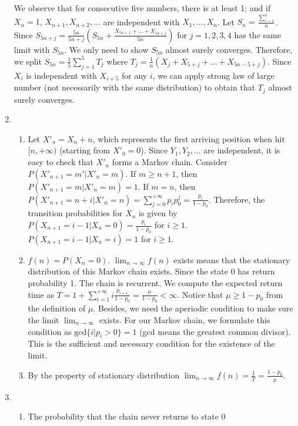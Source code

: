 \documentclass{article}
\begin{document}
\begin{enumerate}
We observe that for consecutive five numbers, there
is at least 1; and if $X_n=1$, $X_{n+1}, X_{n+2},
\dots$ are independent with $X_{1}, \dots, X_{n}$.
Let $S_n=\frac{\sum_{i=1}^n}{n}$.
Since $S_{5n+j} = \frac{5n}{5n+j}(S_{5n} + \frac{X_{5n+1}+\dots + X_{5n+j}}{5n})$ for $j=1,2,3,4$ has the same limit with $S_{5n}$.
We only need to show $S_{5n}$ almost surely converges.
Therefore, we split $S_{5n}=\frac{1}{5}\sum_{j=1}^5 T_j$
where $T_j
= \frac{1}{n}(X_j + X_{5+j} + \dots + X_{5n-5+j})$.
Since $X_i$ is independent with $X_{i+5}$
for any $i$, we can apply strong law of large number
(not necessarily with the same
distribution) to obtain that $T_j$ almost surely
converges.
\item 
\begin{enumerate}
    \item Let $X'_n = X_n + n$, which
    represents the first arriving position when hit $[n,+\infty)$ (starting
    from $X'_0=0$).
    Since $Y_1, Y_2, \dots $ are
    independent, it is easy to check that
    $X'_n$ forms a Markov chain.
    Consider $P(X'_{n+1}=m'| X'_n=m)$.
    If $m\geq n+1$, then $P(X'_{n+1}=m| X'_n=m)=1$.
    If $m=n$, then
    $P(X'_{n+1}=n+i|X'_n=n)=
    \sum_{j=0}^{+\infty} p_i p_0^j
    =\frac{p_i}{1-p_0}$.
    Therefore, the transition probabilities
    for $X_n$ is given by
    $P(X_{n+1}=i-1 | X_n=0) = \frac{p_i}{1-p_0}$
    for $i\geq 1$.
    $P(X_{n+1}=i-1|X_n=i)=1$
    for $i\geq 1$.
    \item $f(n)=P(X_n=0)$. $\lim_{n\to \infty} f(n)$
    exists means that
    the stationary distribution of this Markov chain exists. Since the state $0$ has return probability 1. The chain is recurrent.
    We compute the expected return time
    as $T=1+\sum_{i=1}^{+\infty} i\frac{p_{i+1}}{1-p_0} = \frac{\mu}{1-p_0} <\infty$. Notice that $\mu\geq 1-p_0$ from
    the definition of $\mu$. Besides, we need
    the aperiodic condition to make sure
    the limit $\lim_{n\to \infty}$
    exists. For our Markov chain, we formulate this condition
    as
    $\textrm{gcd}\{i | p_i > 0\}=1$ (gcd means the greatest common divisor). This is the sufficient and necessary condition for the existence
    of the limit.
    \item By the property of stationary
    distribution
    $\lim_{n\to \infty} f(n)=\frac{1}{T}=\frac{1-p_0}{\mu}$.
\end{enumerate}
\item \begin{enumerate}
    \item The probability that
    the chain never returns to state 0

\end{enumerate}
\end{enumerate}
\end{document}
